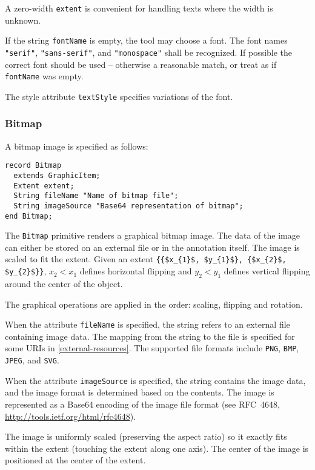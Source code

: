 \begin{nonnormative}
A zero-width \lstinline!extent! is convenient for handling texts where the width is unknown.
\end{nonnormative}

If the string \lstinline!fontName! is empty, the tool may choose a font.  The font names \lstinline!"serif"!, \lstinline!"sans-serif"!, and \lstinline!"monospace"! shall be recognized.  If possible
the correct font should be used -- otherwise a reasonable match, or treat as if \lstinline!fontName! was empty.

The style attribute \lstinline!textStyle! specifies variations of the font.

\subsubsection{Bitmap}\label{bitmap}

A bitmap image is specified as follows:
\begin{lstlisting}[language=modelica]
record Bitmap
  extends GraphicItem;
  Extent extent;
  String fileName "Name of bitmap file";
  String imageSource "Base64 representation of bitmap";
end Bitmap;
\end{lstlisting}%
The \lstinline!Bitmap! primitive renders a graphical bitmap image.
The data of the image can either be stored on an external file or in the annotation itself.
The image is scaled to fit the extent.
Given an extent \lstinline!{{$x_{1}$, $y_{1}$}, {$x_{2}$, $y_{2}$}}!, $x_{2} < x_{1}$ defines horizontal flipping and $y_{2} < y_{1}$ defines vertical flipping around the center of the object.

The graphical operations are applied in the order: scaling, flipping and rotation.

When the attribute \lstinline!fileName! is specified, the string refers to an
external file containing image data. The mapping from the string to the
file is specified for some URIs in \cref{external-resources}. The supported file
formats include \lstinline!PNG!, \lstinline!BMP!, \lstinline!JPEG!,
and \lstinline!SVG!.

When the attribute \lstinline!imageSource! is specified, the string contains the
image data, and the image format is determined based on the contents.
The image is represented as a Base64 encoding of the image file format
(see RFC~4648, \url{http://tools.ietf.org/html/rfc4648}).

The image is uniformly scaled (preserving the aspect ratio) so it exactly fits within the extent (touching the
extent along one axis).  The center of the image is positioned at the center of the extent.

